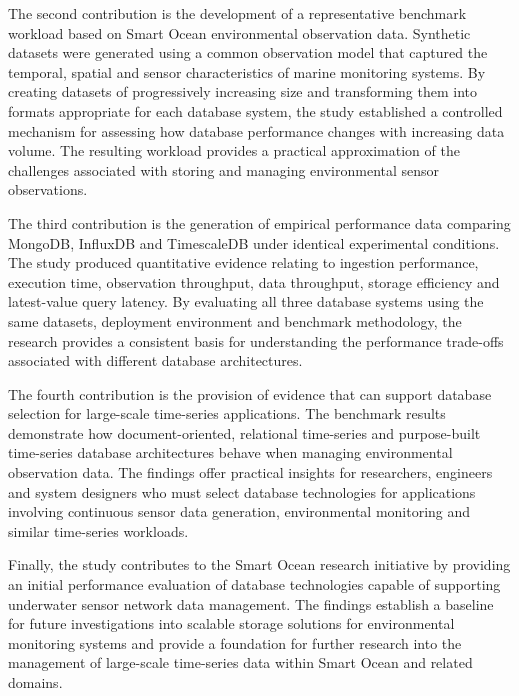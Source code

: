 The second contribution is the development of a representative benchmark workload based on Smart Ocean environmental observation data. Synthetic datasets were generated using a common observation model that captured the temporal, spatial and sensor characteristics of marine monitoring systems. By creating datasets of progressively increasing size and transforming them into formats appropriate for each database system, the study established a controlled mechanism for assessing how database performance changes with increasing data volume. The resulting workload provides a practical approximation of the challenges associated with storing and managing environmental sensor observations.



The third contribution is the generation of empirical performance data comparing MongoDB, InfluxDB and TimescaleDB under identical experimental conditions. The study produced quantitative evidence relating to ingestion performance, execution time, observation throughput, data throughput, storage efficiency and latest-value query latency. By evaluating all three database systems using the same datasets, deployment environment and benchmark methodology, the research provides a consistent basis for understanding the performance trade-offs associated with different database architectures.



The fourth contribution is the provision of evidence that can support database selection for large-scale time-series applications. The benchmark results demonstrate how document-oriented, relational time-series and purpose-built time-series database architectures behave when managing environmental observation data. The findings offer practical insights for researchers, engineers and system designers who must select database technologies for applications involving continuous sensor data generation, environmental monitoring and similar time-series workloads.



Finally, the study contributes to the Smart Ocean research initiative by providing an initial performance evaluation of database technologies capable of supporting underwater sensor network data management. The findings establish a baseline for future investigations into scalable storage solutions for environmental monitoring systems and provide a foundation for further research into the management of large-scale time-series data within Smart Ocean and related domains.


